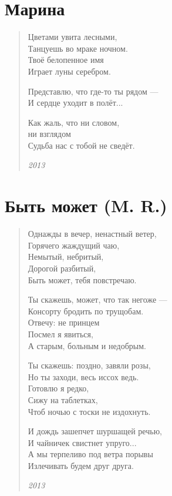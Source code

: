 \documentclass[a4paper,12pt,fleqn]{book}\usepackage{polyglossia}\setdefaultlanguage[babelshorthands=true]{russian}\setotherlanguage{english}\defaultfontfeatures{Ligatures=TeX,Mapping=tex-text}\usepackage{xcolor}\newcommand{\ml}[3]{#2}
\begin{document}
\section{Марина}

\begin{verse}
Цветами увита лесными,\\
Танцуешь во мраке ночном.\\
Твоё белопенное имя\\
Играет луны серебром.

Представлю, что где-то ты рядом ---\\
И сердце уходит в полёт...

Как жаль, что ни словом,\\
ни взглядом\\
Судьба нас с тобой не сведёт.

\emph{2013}
\end{verse}
\newpage

\section{Быть может (M. R.)}

\begin{verse}
Однажды в вечер, ненастный ветер,\\
Горячего жаждущий чаю,\\
Немытый, небритый,\\
Дорогой разбитый,\\
Быть может, тебя повстречаю.

Ты скажешь, может, что так негоже ---\\
Консорту бродить по трущобам.\\
Отвечу: не принцем\\
Посмел я явиться,\\
А старым, больным и недобрым.

Ты скажешь: поздно, завяли розы,\\
Но ты заходи, весь иссох ведь.\\
Готовлю я редко,\\
Сижу на таблетках,\\
Чтоб ночью с тоски не издохнуть.

И дождь зашепчет шуршащей речью,\\
И чайничек свистнет упруго...\\
А мы терпеливо под ветра порывы\\
Излечивать будем друг друга.

\emph{2013}
\end{verse}
\newpage
\end{document}
